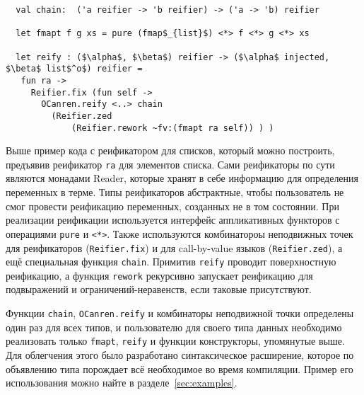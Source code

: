 \begin{lstlisting}
  val chain:  ('a reifier -> 'b reifier) -> ('a -> 'b) reifier

  let fmapt f g xs = pure (fmap$_{list}$) <*> f <*> g <*> xs

  let reify : ($\alpha$, $\beta$) reifier -> ($\alpha$ injected, $\beta$ list$^o$) reifier =
   fun ra ->
     Reifier.fix (fun self ->
       OCanren.reify <..> chain
         (Reifier.zed
             (Reifier.rework ~fv:(fmapt ra self)) ) )
\end{lstlisting}

\noindent Выше пример кода с реификатором для списков, который можно построить, предъявив реификатор \lstinline=ra= для элементов списка.
Сами реификаторы по сути являются монадами Reader, которые хранят в себе информацию для определения переменных в терме.
Типы реификаторов абстрактные, чтобы пользователь не смог провести реификацию переменных, созданных не в том состоянии.
При реализации реификации используется интерфейс аппликативных функторов с операциями \lstinline=pure=  и \lstinline=<*>=.
Также используются комбинатороы неподвижных точек для реификаторов (\lstinline=Reifier.fix=) и для call-by-value языков (\lstinline=Reifier.zed=),
а ещё специальная функция \lstinline=chain=. Примитив \lstinline=reify= проводит поверхностную реификацию, а функция \lstinline=rework= рекурсивно запускает реификацию для подвыражений и ограничений-неравенств, если таковые присутствуют.

Функции \lstinline=chain=, \lstinline=OCanren.reify= и комбинаторы неподвижной точки определены один раз для всех типов, и пользователю для своего типа данных необходимо реализовать только \lstinline=fmapt=, \lstinline=reify= и функции конструкторы, упомянутые выше.
Для облегчения этого было разработано синтаксическое расширение, которое по объявлению типа порождает всё необходимое во время компиляции. Пример его использования можно найте в разделе~\ref{sec:examples}.

